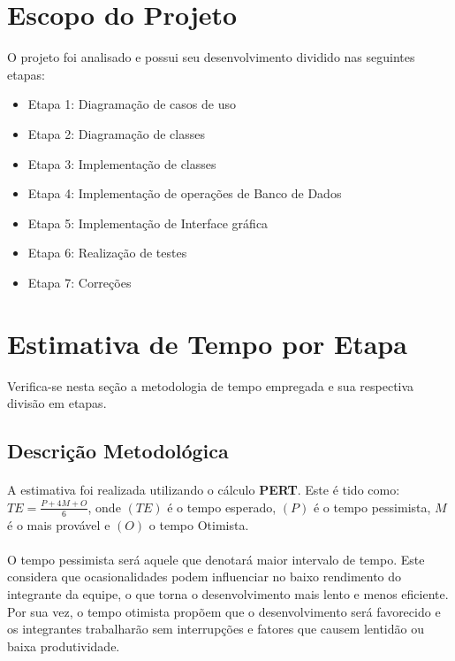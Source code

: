 \documentclass[12pt,a4paper]{article}
\begin{document}
	\section{Escopo do Projeto}
	O projeto foi analisado e possui seu desenvolvimento dividido nas seguintes etapas:
	\begin{itemize}			
		\item Etapa 1: Diagramação de casos de uso
		\item Etapa 2: Diagramação de classes
		\item Etapa 3: Implementação de classes
		\item Etapa 4: Implementação de operações de Banco de Dados
		\item Etapa 5: Implementação de Interface gráfica
		\item Etapa 6: Realização de testes
		\item Etapa 7: Correções
		
	\end{itemize}
	
	\section{Estimativa de Tempo por Etapa}
	Verifica-se nesta seção a metodologia de tempo empregada e sua respectiva divisão em etapas.
		\subsection{Descrição Metodológica}
		\paragraph{} A estimativa foi realizada utilizando o cálculo \textbf{PERT}. Este é tido como:
	$TE = \frac{P + 4M + O}{6}$, onde $(TE)$ é o tempo esperado, $(P)$ é o tempo pessimista, $M$ é o mais provável e $(O)$ o tempo Otimista.
	
	\paragraph{} O tempo pessimista será aquele que denotará maior intervalo de tempo. Este considera que ocasionalidades podem influenciar no baixo rendimento do integrante da equipe, o que torna o desenvolvimento mais lento e menos eficiente. Por sua vez, o tempo otimista propõem que o desenvolvimento será favorecido e os integrantes trabalharão sem interrupções e fatores que causem lentidão ou baixa produtividade. 
	
\end{document}
